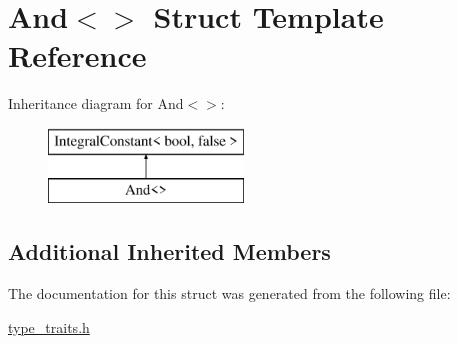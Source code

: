 \hypertarget{struct_and_3_4}{}\section{And$<$$>$ Struct Template Reference}
\label{struct_and_3_4}
Inheritance diagram for And$<$$>$\+:\begin{figure}[H]
\begin{center}
\leavevmode
\includegraphics[height=2.000000cm]{struct_and_3_4}
\end{center}
\end{figure}
\subsection*{Additional Inherited Members}


The documentation for this struct was generated from the following file\+:\begin{DoxyCompactItemize}
\item 
\hyperlink{type__traits_8h}{type\+\_\+traits.\+h}\end{DoxyCompactItemize}
